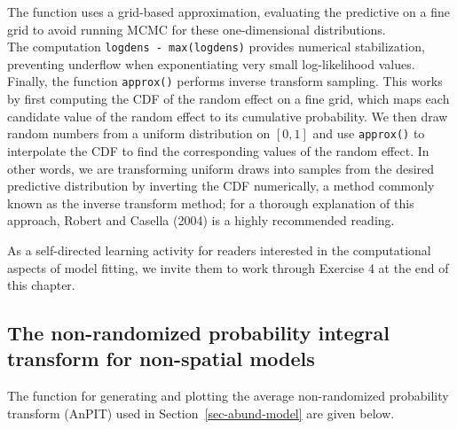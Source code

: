 \documentclass[
  letterpaper,
]{krantz}
\begin{document}
The function uses a grid-based approximation, evaluating the predictive
on a fine grid to avoid running MCMC for these one-dimensional
distributions.\\
The computation \texttt{logdens\ -\ max(logdens)} provides numerical
stabilization, preventing underflow when exponentiating very small
log-likelihood values.\\
Finally, the function \texttt{approx()} performs inverse transform
sampling. This works by first computing the CDF of the random effect on
a fine grid, which maps each candidate value of the random effect to its
cumulative probability. We then draw random numbers from a uniform
distribution on \([0,1]\) and use \texttt{approx()} to interpolate the
CDF to find the corresponding values of the random effect. In other
words, we are transforming uniform draws into samples from the desired
predictive distribution by inverting the CDF numerically, a method
commonly known as the inverse transform method; for a thorough
explanation of this approach, Robert and Casella (2004) is a highly
recommended reading.

As a self-directed learning activity for readers interested in the
computational aspects of model fitting, we invite them to work through
Exercise 4 at the end of this chapter.

\subsection{The non-randomized probability integral transform for
non-spatial models}\label{sec-nonspat-anpit}

The function for generating and plotting the average non-randomized
probability transform (AnPIT) used in Section~\ref{sec-abund-model} are
given below.
\end{document}
